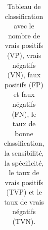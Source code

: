 \documentclass[
  11pt,
  letterpaper,
]{scrbook}
\theoremstyle{definition}
\theoremstyle{remark}
\begin{document}
\begin{longtable}[]{@{}
  >{\raggedleft\arraybackslash}p{}
  >{\raggedleft\arraybackslash}p{}
  >{\raggedleft\arraybackslash}p{}
  >{\raggedleft\arraybackslash}p{}
  >{\raggedleft\arraybackslash}p{}
  >{\raggedleft\arraybackslash}p{}
  >{\raggedleft\arraybackslash}p{}
  >{\raggedleft\arraybackslash}p{}
  >{\raggedleft\arraybackslash}p{}
  >{\raggedleft\arraybackslash}p{}@{}}

\caption{\label{tbl-classification-loocv}Tableau de classification avec
le nombre de vrais positifs (VP), vrais négatifs (VN), faux positifs
(FP) et faux négatifs (FN), le taux de bonne classification, la
sensibilité, la spécificité, le taux de vrais positifs (TVP) et le taux
de vrais négatifs (TVN).}

\tabularnewline


\end{longtable}
\end{document}
